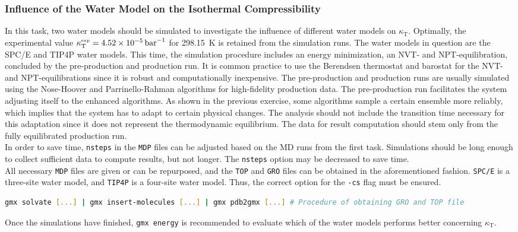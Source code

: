 \documentclass[9pt,tutorial]{livecoms}
\newcommand{\code}[1]{\colorbox{light-gray}{\texttt{#1}}}
\begin{document}
\subsubsection*{Influence of the Water Model on the Isothermal Compressibility}
In this task, two water models should be simulated to investigate the influence of different water models on $\kappa_\text{T}$. Optimally, the experimental value $\kappa_\text{T}^\text{\tiny exp} = \SI{4.52e-5}{\per\bar}$ for \SI{298.15}{\kelvin} is retained from the simulation runs.\cite{Linse2021} The water models in question are the SPC/E and TIP4P water models. This time, the simulation procedure includes an energy minimization, an NVT- and NPT-equilibration, concluded by the pre-production and production run. It is common practice to use the Berendsen thermostat and barostat for the NVT- and NPT-equilibrations since it is robust and computationally inexpensive. The pre-production and production runs are usually simulated using the Nose-Hoover and Parrinello-Rahman algorithms for high-fidelity production data. The pre-production run facilitates the system adjusting itself to the enhanced algorithms. As shown in the previous exercise, some algorithms sample a certain ensemble more reliably, which implies that the system has to adapt to certain physical changes. The analysis should not include the transition time necessary for this adaptation since it does not represent the thermodynamic equilibrium. The data for result computation should stem only from the fully equilibrated production run.\\
In order to save time, \code{nsteps} in the \texttt{MDP} files can be adjusted based on the MD runs from the first task. Simulations should be long enough to collect sufficient data to compute results, but not longer. The \code{nsteps} option may be decreased to save time.\\
All necessary \texttt{MDP} files are given or can be repurposed, and the \texttt{TOP} and \texttt{GRO} files can be obtained in the aforementioned fashion. \texttt{SPC/E} is a three-site water model, and \texttt{TIP4P} is a four-site water model. Thus, the correct option for the \code{-cs} flag must be ensured.
\begin{lstlisting}[language=bash]
gmx solvate [...] | gmx insert-molecules [...] | gmx pdb2gmx [...] # Procedure of obtaining GRO and TOP file
\end{lstlisting}
Once the simulations have finished, \code{gmx energy} is recommended to evaluate which of the water models performs better concerning $\kappa_\text{T}$.
\end{document}
